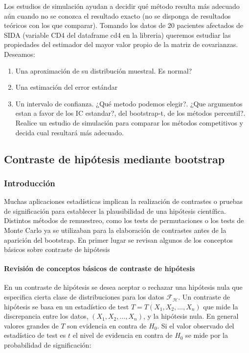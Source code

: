 \documentclass[
]{article}
\providecommand{\tightlist}{%
  \setlength{\itemsep}{0pt}\setlength{\parskip}{0pt}}
\begin{document}
Los estudios de simulación ayudan a decidir qué método resulta más adecuado aún cuando no se conozca el resultado exacto (no se disponga de resultados teóricos con los que comparar). Tomando los datos de 20 pacientes afectados de SIDA (variable CD4 del dataframe cd4 en la libreria) queremos estudiar las propiedades del estimador del mayor valor propio de la matriz de covarianzas. Deseamos:

\begin{enumerate}
\def\labelenumi{\arabic{enumi}.}
\tightlist
\item
  Una aproximación de su distribución muestral. Es normal?
\item
  Una estimación del error estándar
\item
  Un intervalo de confianza. ¿Qué metodo podemos elegir?. ¿Que argumentos estan a favor de los IC estandar?, del bootstrap-t, de los métodos percentil?. Realice un estudio de simulación para comparar los métodos competitivos y decida cual resultará más adecuado.
\end{enumerate}

\subsection{Contraste de hipótesis mediante bootstrap}\label{contraste-de-hipuxf3tesis-mediante-bootstrap}

\subsubsection{Introducción}\label{introducciuxf3n-12}

Muchas aplicaciones estadísticas implican la realización de contrastes o pruebas de significación para establecer la plausibilidad de una hipótesis científica. Distintos métodos de remuestreo, como los tests de permutaciones o los tests de Monte Carlo ya se utilizaban para la elaboración de contrastes antes de la aparición del bootstrap. En primer lugar se revisan algunos de los conceptos básicos sobre contraste de hipótesis

\paragraph{Revisión de conceptos básicos de contraste de hipótesis}\label{revisiuxf3n-de-conceptos-buxe1sicos-de-contraste-de-hipuxf3tesis}

En un contraste de hipótesis se desea aceptar o rechazar una hipótesis nula que especifica cierta clase de distribuciones para los datos \(\mathcal{F}_{\mathcal{H}}\). Un contraste de hipótesis se basa en un estadístico de test \(T=T\left(X_{1}, X_{2}, \ldots, X_{n}\right)\) que mide la discrepancia entre los datos, \(\left(X_{1}, X_{2}, \ldots, X_{n}\right)\), y la hipótesis nula. En general valores grandes de \(T\) son evidencia en contra de \(H_{0}\). Si el valor observado del estadístico de test es \(t\) el nivel de evidencia en contra de \(H_{0}\) se mide por la probabilidad de significación:
\end{document}
